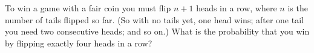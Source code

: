 To win a game with a fair coin you must flip $n+1$ heads in a row, where $n$ is the number of tails flipped so far. (So with no tails yet, one head wins; after one tail you need two consecutive heads; and so on.) What is the probability that you win by flipping exactly four heads in a row?
